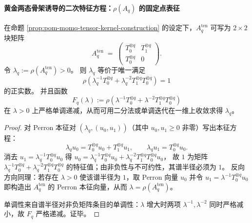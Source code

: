 \paragraph{黄金两态骨架诱导的二次特征方程：\texorpdfstring{$\rho(A_q)$}{rho(Aq)} 的固定点表征}
\begin{proposition}\label{prop:pom-golden-grammar-fixed-point-rho-aq}
在命题 \ref{prop:pom-momq-tensor-kernel-construction} 的设定下，\(A_q^{\mathrm{ten}}\) 可写为 \(2\times 2\) 块矩阵
\[
A_q^{\mathrm{ten}}
\;=\;
\begin{pmatrix}
T_0^{\otimes q} & T_1^{\otimes q}\\[2pt]
T_0^{\otimes q} & 0
\end{pmatrix}.
\]
令 \(\lambda_q:=\rho(A_q^{\mathrm{ten}})>0\)。
则 \(\lambda_q\) 等价于唯一满足
\[
\boxed{\;
\rho\!\left(\lambda_q^{-1}T_0^{\otimes q}+\lambda_q^{-2}T_1^{\otimes q}T_0^{\otimes q}\right)=1\; }
\]
的正实数。
并且函数
\[
F_q(\lambda):=\rho\!\left(\lambda^{-1}T_0^{\otimes q}+\lambda^{-2}T_1^{\otimes q}T_0^{\otimes q}\right)
\]
在 \(\lambda>0\) 上严格单调递减，从而可用二分法或单调迭代在一维上收敛求得 \(\lambda_q\)。
\end{proposition}
\begin{proof}
对 Perron 本征对 \((\lambda_q,(u_0,u_1))\)（其中 \(u_0,u_1\ge 0\) 非零）写出本征方程：
\[
\lambda_q u_0=T_0^{\otimes q}u_0+T_1^{\otimes q}u_1,
\qquad
\lambda_q u_1=T_0^{\otimes q}u_0.
\]
消去 \(u_1=\lambda_q^{-1}T_0^{\otimes q}u_0\) 得
\(
u_0=\lambda_q^{-1}T_0^{\otimes q}u_0+\lambda_q^{-2}T_1^{\otimes q}T_0^{\otimes q}u_0
\)，
故 \(1\) 为矩阵 \(\lambda_q^{-1}T_0^{\otimes q}+\lambda_q^{-2}T_1^{\otimes q}T_0^{\otimes q}\) 的特征值；由非负性与不可约性，其谱半径必须为 \(1\)。
反向方向同理：若存在 \(\lambda>0\) 使该谱半径为 \(1\)，取 Perron 向量 \(u_0\) 并令 \(u_1=\lambda^{-1}T_0^{\otimes q}u_0\) 即构造出 \(A_q^{\mathrm{ten}}\) 的 Perron 本征向量，从而 \(\lambda=\rho(A_q^{\mathrm{ten}})\)。
\par
单调性来自谱半径对非负矩阵条目的单调性：\(\lambda\) 增大时两项 \(\lambda^{-1},\lambda^{-2}\) 同时严格减小，故 \(F_q\) 严格递减。证毕。
\end{proof}

